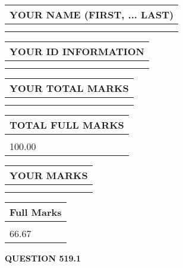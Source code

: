 \documentclass{ctexart}
\begin{document}
   
   
   
\newpage 
\setcounter{page}{ 
   519001 } 
   
   
   
   
\noindent\begin{tabular}{|l|}
\hline
YOUR NAME (FIRST, ... LAST)  \\
\hline
 \\ 
 \\ 
\hline
\end{tabular}
\hspace{0.05in} \begin{tabular}{|l|}
\hline
 YOUR   ID   INFORMATION  \\
\hline
 \\ 
 \\ 
\hline
\end{tabular}
   
   
\vspace{0.2in}\noindent\begin{tabular}{|l|}
\hline
YOUR TOTAL MARKS  \\
\hline
 \\ 
 \\ 
\hline
\end{tabular}
\hspace{0.05in} \begin{tabular}{|l|}
\hline
TOTAL FULL MARKS  \\
\hline
 \\ 
100.00 \\
\hline
\end{tabular}
   
   
 \vspace{0.2in}
 
 
 
 
   
   
  
\vspace{0.2in}
  
\noindent\begin{tabular}{|l|}
\hline
 YOUR MARKS  \\
\hline
 \\ 
 \\ 
\hline
\end{tabular}
\hspace{0.05in} \begin{tabular}{|l|}
\hline
 Full Marks  \\
\hline
 \\ 
66.67 \\
\hline
\end{tabular}
{\textbf{\Large{QUESTION
519.1 
}}}
  
\end{document}
